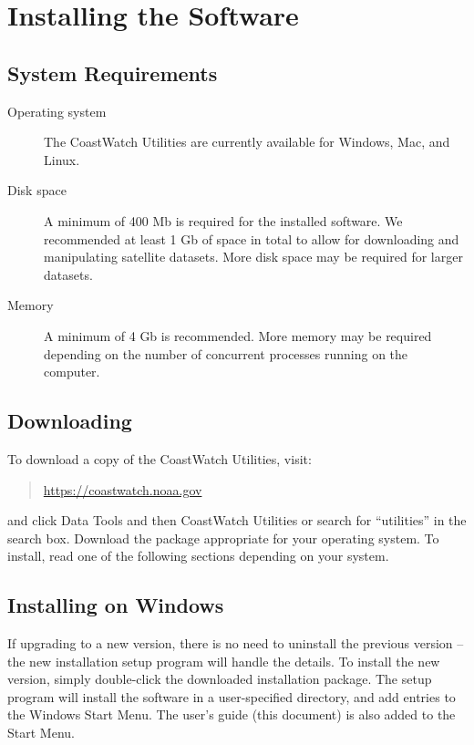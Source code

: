 \section{Installing the Software}

\subsection{System Requirements}

\begin{description}

  \item[Operating system] The CoastWatch Utilities are currently
  available for Windows, Mac, and Linux.

  \item[Disk space] A minimum of 400 Mb is required for the installed
  software. We recommended at least 1 Gb of space in total to
  allow for downloading and manipulating satellite datasets. More
  disk space may be required for larger datasets.

  \item[Memory] A minimum of 4 Gb is recommended.  More memory
  may be required depending on the number of concurrent processes
  running on the computer.

\end{description}

\subsection{Downloading}

To download a copy of the CoastWatch Utilities, visit:
\begin{quote}
  \url{https://coastwatch.noaa.gov}
\end{quote}
and click {\gui Data Tools} and then {\gui CoastWatch Utilities} or 
search for ``utilities'' in the search box.  Download the package 
appropriate for your operating system. To install, read one of the following sections
depending on your system.

\subsection{Installing on Windows}

If upgrading to a new version, there is no need to uninstall the
previous version -- the new installation setup program will handle
the details.  To install the new version, simply double-click the
downloaded installation package. The setup program will install the
software in a user-specified directory, and add entries to the Windows {\gui Start
Menu}.  The user's guide (this document) is also added to the {\gui Start
Menu}.

